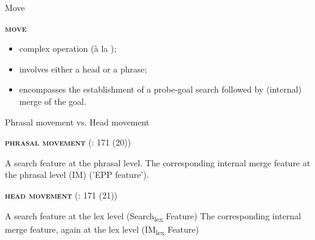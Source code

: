 \documentclass[lesson_slides]{subfiles}
\begin{document}
\begin{frame}[c]{Move}

    \noindent\textbf{\textsc{move}} \pause
    \begin{itemize}
        \item[\ding{227}] complex operation (à la \citealt{chomsky2001});\\ \pause
        \item[\ding{227}] involves either a head or a phrase;\\ \pause
        \item[\ding{227}] encompasses the establishment of a probe-goal search followed by (internal) merge of the goal.
    \end{itemize}
        
\end{frame}
\begin{frame}[c]{Phrasal movement vs. Head movement}

    \noindent\textbf{\textsc{phrasal movement}} (\citealt{rizzi2017}: 171 (20)) \pause
        \begin{xlist}
            \ex A search feature at the phrasal level. \pause
            \ex The corresponding internal merge feature at the phrasal level (IM) ('EPP feature'). \pause
        \end{xlist}

    \noindent\textbf{\textsc{head movement}} (\citealt{rizzi2017}: 171 (21)) \pause
        \begin{xlist}
            \ex A search feature at the lex level (Search\textsubscript{lex} Feature) \pause
            \ex The corresponding internal merge feature, again at the lex level (IM\textsubscript{lex} Feature)
        \end{xlist}
        
\end{frame}
\end{document}
